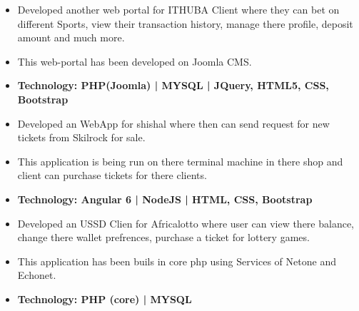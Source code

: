 \documentclass[10pt,a4paper,ragged2e]{altacv}
\begin{document}
\smallskip

\begin{itemize}
\item Developed another web portal for ITHUBA Client where they can bet on different Sports, view their transaction history, manage there profile, deposit amount and much more.
\item This web-portal has been developed on Joomla CMS.
\item\bf{Technology}{: PHP(Joomla) | MYSQL | JQuery, HTML5, CSS, Bootstrap }

\end{itemize}
\smallskip

\begin{itemize}
\item Developed an WebApp for shishal where then can send request for new tickets from Skilrock for sale.
\item This application is being run on there terminal machine in there shop and client can purchase tickets for there clients.
\item\bf{Technology}{: Angular 6 | NodeJS | HTML, CSS, Bootstrap }
\end{itemize}
\smallskip

\begin{itemize}
\item Developed an USSD Clien for Africalotto where user can view there balance, change there wallet prefrences, purchase a ticket for lottery games.
\item This application has been buils in core php using Services of Netone and Echonet.
\item\bf{Technology}{: PHP (core) | MYSQL }
\end{itemize}
\smallskip


\end{document}
